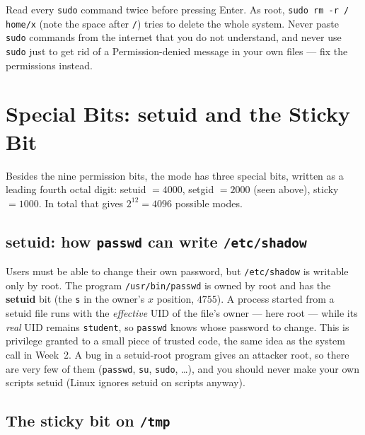 \documentclass[11pt,a4paper]{article}
\newcommand{\term}[1]{\textbf{\color{mintdeep}#1}}
\newcommand{\cmd}[1]{\texttt{#1}}
\begin{document}
\begin{keyidea}
Read every \texttt{sudo} command twice before pressing Enter. As root, \texttt{sudo rm -r / home/x} (note the space after \texttt{/}) tries to delete the whole system. Never paste \texttt{sudo} commands from the internet that you do not understand, and never use \texttt{sudo} just to get rid of a Permission-denied message in your own files --- fix the permissions instead.
\end{keyidea}

\section{Special Bits: setuid and the Sticky Bit}
\label{sec:special}

Besides the nine permission bits, the mode has three special bits, written as a leading fourth octal digit: setuid $= 4000$, setgid $= 2000$ (seen above), sticky $= 1000$. In total that gives $2^{12} = 4096$ possible modes.

\subsection{setuid: how \cmd{passwd} can write \texttt{/etc/shadow}}



Users must be able to change their own password, but \texttt{/etc/shadow} is writable only by root. The program \texttt{/usr/bin/passwd} is owned by root and has the \term{setuid} bit (the \texttt{s} in the owner's $x$ position, $4755$). A process started from a setuid file runs with the \emph{effective} UID of the file's owner --- here root --- while its \emph{real} UID remains \texttt{student}, so \cmd{passwd} knows whose password to change. This is privilege granted to a small piece of trusted code, the same idea as the system call in Week~2. A bug in a setuid-root program gives an attacker root, so there are very few of them (\cmd{passwd}, \cmd{su}, \cmd{sudo}, \dots), and you should never make your own scripts setuid (Linux ignores setuid on scripts anyway).

\subsection{The sticky bit on \texttt{/tmp}}
\end{document}
